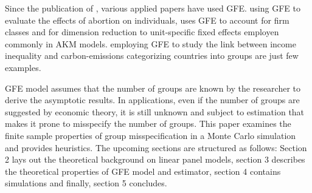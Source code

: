 Since the publication of \textcite{bonhomme2015grouped}, various applied papers have used GFE.  \textcite{janys2021mental} using GFE to evaluate the effects of abortion on individuals, \textcite{bonhomme2019distributional} uses GFE to account for firm classes and for dimension reduction to unit-specific fixed effects employen commonly in AKM models. \textcite{grunewald2017trade} employing GFE to study the link between income inequality and carbon-emissions categorizing countries into groups are just few examples.

GFE model assumes that the number of groups are known by the researcher to derive the asymptotic results. In applications, even if the number of groups are suggested by economic theory, it is still unknown and subject to estimation that makes it prone to misspecify the number of groups. This paper examines the finite sample properties of group misspecification in a Monte Carlo simulation and provides heuristics.
The upcoming sections are structured as follows: Section 2 lays out the theoretical background on linear panel models, section 3 describes the theoretical properties of GFE model and estimator, section 4 contains simulations and finally, section 5 concludes.






